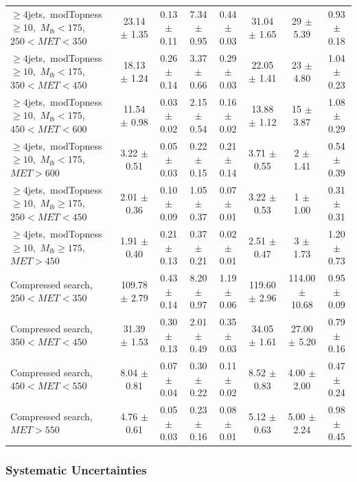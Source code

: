 \begin{table}
{\begin{tabular}{|l|c c c c c|c|c|}
\hline
$\ge4$jets,~modTopness$\ge10$,~$M_{lb}<175$,~$250<MET<350$  & 23.14 $\pm$ 1.35  & 0.13 $\pm$ 0.11  & 7.34 $\pm$ 0.95  & 0.44 $\pm$ 0.03  & 31.04 $\pm$ 1.65  & 29 $\pm$ 5.39  & 0.93 $\pm$ 0.18 \\*
$\ge4$jets,~modTopness$\ge10$,~$M_{lb}<175$,~$350<MET<450$  & 18.13 $\pm$ 1.24  & 0.26 $\pm$ 0.14  & 3.37 $\pm$ 0.66  & 0.29 $\pm$ 0.03  & 22.05 $\pm$ 1.41  & 23 $\pm$ 4.80  & 1.04 $\pm$ 0.23 \\*
$\ge4$jets,~modTopness$\ge10$,~$M_{lb}<175$,~$450<MET<600$  & 11.54 $\pm$ 0.98  & 0.03 $\pm$ 0.02  & 2.15 $\pm$ 0.54  & 0.16 $\pm$ 0.02  & 13.88 $\pm$ 1.12  & 15 $\pm$ 3.87  & 1.08 $\pm$ 0.29 \\*
$\ge4$jets,~modTopness$\ge10$,~$M_{lb}<175$,~$MET>600$  & 3.22 $\pm$ 0.51  & 0.05 $\pm$ 0.03  & 0.22 $\pm$ 0.15  & 0.21 $\pm$ 0.14  & 3.71 $\pm$ 0.55  & 2 $\pm$ 1.41  & 0.54 $\pm$ 0.39 \\*
\hline
$\ge4$jets,~modTopness$\ge10$,~$M_{lb}\ge175$,~$250<MET<450$  & 2.01 $\pm$ 0.36  & 0.10 $\pm$ 0.09  & 1.05 $\pm$ 0.37  & 0.07 $\pm$ 0.01  & 3.22 $\pm$ 0.53  & 1 $\pm$ 1.00  & 0.31 $\pm$ 0.31 \\*
$\ge4$jets,~modTopness$\ge10$,~$M_{lb}\ge175$,~$MET>450$  & 1.91 $\pm$ 0.40  & 0.21 $\pm$ 0.13  & 0.37 $\pm$ 0.21  & 0.02 $\pm$ 0.01  & 2.51 $\pm$ 0.47  & 3 $\pm$ 1.73  & 1.20 $\pm$ 0.73 \\*
\hline
Compressed search, $250<MET<350$  & 109.78 $\pm$ 2.79  & 0.43 $\pm$ 0.14  & 8.20 $\pm$ 0.97  & 1.19 $\pm$ 0.06  & 119.60 $\pm$ 2.96  & 114.00 $\pm$ 10.68  & 0.95 $\pm$ 0.09 \\*
Compressed search, $350<MET<450$  & 31.39 $\pm$ 1.53  & 0.30 $\pm$ 0.13  & 2.01 $\pm$ 0.49  & 0.35 $\pm$ 0.03  & 34.05 $\pm$ 1.61  & 27.00 $\pm$ 5.20  & 0.79 $\pm$ 0.16 \\*
Compressed search, $450<MET<550$  & 8.04 $\pm$ 0.81  & 0.07 $\pm$ 0.04  & 0.30 $\pm$ 0.22  & 0.11 $\pm$ 0.02  & 8.52 $\pm$ 0.83  & 4.00 $\pm$ 2.00  & 0.47 $\pm$ 0.24 \\*
Compressed search, $MET>550$  & 4.76 $\pm$ 0.61  & 0.05 $\pm$ 0.03  & 0.23 $\pm$ 0.16  & 0.08 $\pm$ 0.01  & 5.12 $\pm$ 0.63  & 5.00 $\pm$ 2.24  & 0.98 $\pm$ 0.45 \\*
\hline
\end{tabular}
}
\end{table}

\subsubsection{Systematic Uncertainties}
\label{sssec:stop:lostlep:systematics}

